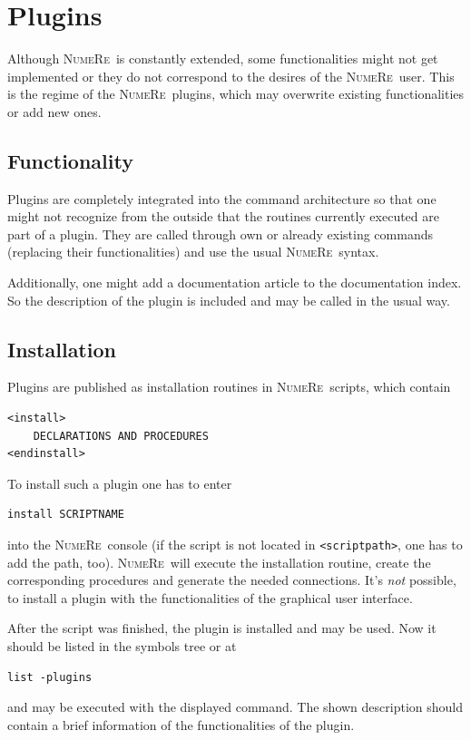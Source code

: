 \documentclass[DIV=14,headsepline,footsepline]{scrbook}
\newcommand{\NR}{\textsc{Nu\-me\-Re}}
\begin{document}
		\chapter{Plugins}
			Although \NR\ is constantly extended, some functionalities might not get implemented or they do not correspond to the desires of the \NR\ user. This is the regime of the \NR\ plugins, which may overwrite existing functionalities or add new ones.
			\section{Functionality}
				Plugins are completely integrated into the command architecture so that one might not recognize from the outside that the routines currently executed are part of a plugin. They are called through own or already existing commands (replacing their functionalities) and use the usual \NR\ syntax.
				
				Additionally, one might add a documentation article to the documentation index. So the description of the plugin is included and may be called in the usual way.
			\section{Installation}
				Plugins are published as installation routines in \NR\ scripts, which contain
				\begin{lstlisting}
<install>
	DECLARATIONS AND PROCEDURES
<endinstall>
				\end{lstlisting}
				To install such a plugin one has to enter
				\begin{lstlisting}
install SCRIPTNAME
				\end{lstlisting}
				into the \NR\ console (if the script is not located in \lstinline+<scriptpath>+, one has to add the path, too). \NR\ will execute the installation routine, create the corresponding procedures and generate the needed connections. It's \emph{not} possible, to install a plugin with the functionalities of the graphical user interface.
				
				After the script was finished, the plugin is installed and may be used. Now it should be listed in the symbols tree or at
				\begin{lstlisting}
list -plugins
				\end{lstlisting}
				and may be executed with the displayed command. The shown description should contain a brief information of the functionalities of the plugin.
				
\end{document}
